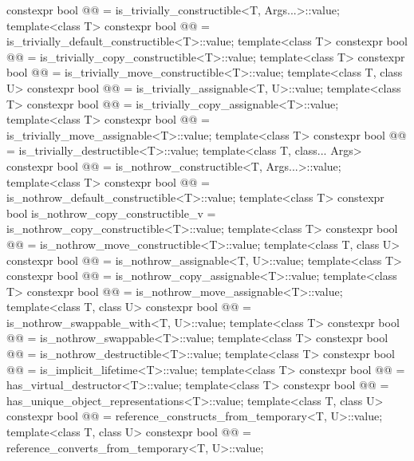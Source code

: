\begin{codeblock}
{    constexpr bool @@ = is_trivially_constructible<T, Args...>::value;
  template<class T>
    constexpr bool @@
      = is_trivially_default_constructible<T>::value;
  template<class T>
    constexpr bool @@ = is_trivially_copy_constructible<T>::value;
  template<class T>
    constexpr bool @@ = is_trivially_move_constructible<T>::value;
  template<class T, class U>
    constexpr bool @@ = is_trivially_assignable<T, U>::value;
  template<class T>
    constexpr bool @@ = is_trivially_copy_assignable<T>::value;
  template<class T>
    constexpr bool @@ = is_trivially_move_assignable<T>::value;
  template<class T>
    constexpr bool @@ = is_trivially_destructible<T>::value;
  template<class T, class... Args>
    constexpr bool @@ = is_nothrow_constructible<T, Args...>::value;
  template<class T>
    constexpr bool @@
      = is_nothrow_default_constructible<T>::value;
  template<class T>
    constexpr bool is_nothrow_copy_constructible_v = is_nothrow_copy_constructible<T>::value;
  template<class T>
    constexpr bool @@ = is_nothrow_move_constructible<T>::value;
  template<class T, class U>
    constexpr bool @@ = is_nothrow_assignable<T, U>::value;
  template<class T>
    constexpr bool @@ = is_nothrow_copy_assignable<T>::value;
  template<class T>
    constexpr bool @@ = is_nothrow_move_assignable<T>::value;
  template<class T, class U>
    constexpr bool @@ = is_nothrow_swappable_with<T, U>::value;
  template<class T>
    constexpr bool @@ = is_nothrow_swappable<T>::value;
  template<class T>
    constexpr bool @@ = is_nothrow_destructible<T>::value;
  template<class T>
    constexpr bool @@ = is_implicit_lifetime<T>::value;
  template<class T>
    constexpr bool @@ = has_virtual_destructor<T>::value;
  template<class T>
    constexpr bool @@
      = has_unique_object_representations<T>::value;
  template<class T, class U>
    constexpr bool @@
      = reference_constructs_from_temporary<T, U>::value;
  template<class T, class U>
    constexpr bool @@
      = reference_converts_from_temporary<T, U>::value;

}
\end{codeblock}
